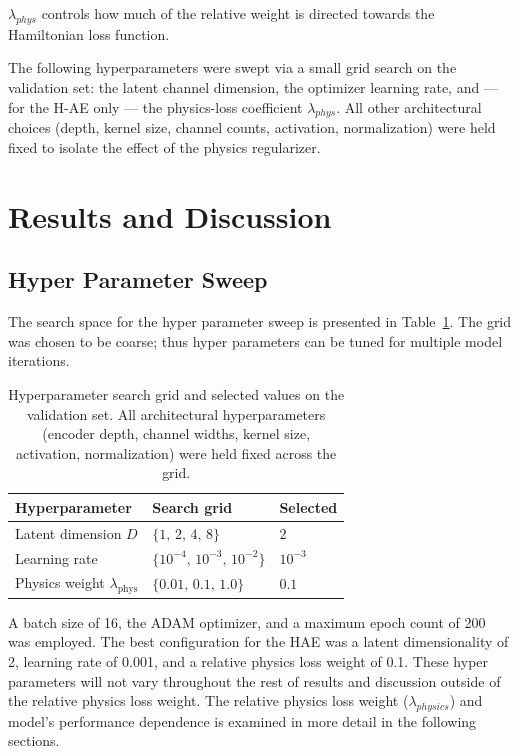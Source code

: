 \documentclass[conference]{IEEEtran}
\begin{document}
$\lambda_{phys}$ controls how much of the relative weight is directed towards the Hamiltonian loss function.

The following hyperparameters were swept via a small grid search on the validation set: the latent channel dimension, the optimizer learning rate, and --- for the H-AE only --- the physics-loss coefficient $\lambda_{phys}$. All other architectural choices (depth, kernel size, channel counts, activation, normalization) were held fixed to isolate the effect of the physics regularizer.

\section{Results and Discussion}

\subsection{Hyper Parameter Sweep}

The search space for the hyper parameter sweep is presented in Table~\ref{tab:hparams}. The grid was chosen to be coarse; thus hyper parameters can be tuned for multiple model iterations.
\begin{table}[H]
    \centering
    \small
    \caption{Hyperparameter search grid and selected values on the validation set. All architectural hyperparameters (encoder depth, channel widths, kernel size, activation, normalization) were held fixed across the grid.}
    \label{tab:hparams}
    \begin{tabular}{lll}
        \toprule
        Hyperparameter & Search grid & Selected \\
        \midrule
        Latent dimension $D$        & $\{1,\, 2,\, 4,\, 8\}$              & $2$ \\
        Learning rate               & $\{10^{-4},\, 10^{-3},\, 10^{-2}\}$ & $10^{-3}$ \\
        Physics weight $\lambda_{\text{phys}}$ & $\{0.01,\, 0.1,\, 1.0\}$ & $0.1$ \\
        \bottomrule
    \end{tabular}
\end{table}
A batch size of 16, the ADAM optimizer, and a maximum epoch count of 200 was employed. The best configuration for the HAE was a latent dimensionality of 2, learning rate of 0.001, and a relative physics loss weight of 0.1. These hyper parameters will not vary throughout the rest of results and discussion outside of the relative physics loss weight. The relative physics loss weight ($\lambda_{physics}$) and model's performance dependence is examined in more detail in the following sections.
\end{document}

